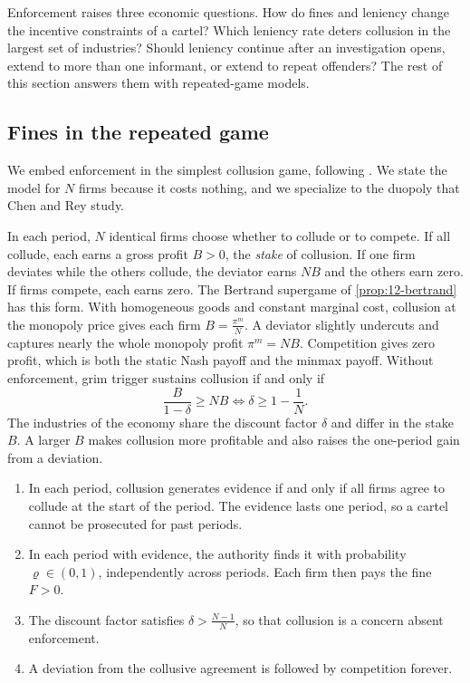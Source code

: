 Enforcement raises three economic questions. How do fines and leniency change the incentive constraints of a
cartel? Which leniency rate deters collusion in the largest set of industries? Should leniency continue after an
investigation opens, extend to more than one informant, or extend to repeat offenders? The rest of this section
answers them with repeated-game models.

\subsection{Fines in the repeated game}\label{sec:12-fines}

We embed enforcement in the simplest collusion game, following \citet[Section~2]{ChenRey2013}. We state the model
for $N$ firms because it costs nothing, and we specialize to the duopoly that Chen and Rey study.

In each period, $N$ identical firms choose whether to collude or to compete. If all collude, each earns a gross profit
$B > 0$, the \emph{stake} of collusion. If one firm deviates while the others collude, the deviator earns $NB$ and the
others earn zero. If firms compete, each earns zero. The Bertrand supergame of \cref{prop:12-bertrand} has this form.
With homogeneous goods and constant marginal cost, collusion at the monopoly price gives each firm
$B = \frac{\pi^m}{N}$. A deviator slightly undercuts and captures nearly the whole monopoly profit $\pi^m = NB$.
Competition gives zero profit, which is both the static Nash payoff and the minmax payoff. Without enforcement, grim
trigger sustains collusion if and only if
\begin{equation*}
\frac{B}{1-\delta} \ge NB \iff \delta \ge 1 - \frac{1}{N}.
\end{equation*}
The industries of the economy share the discount factor $\delta$ and differ in the stake $B$. A larger $B$ makes
collusion more profitable and also raises the one-period gain from a deviation.

\begin{assumption}\label{asm:12-enforcement}
\leavevmode
\begin{enumerate}[label=(\roman*)]
\item In each period, collusion generates evidence if and only if all firms agree to collude at the start of the
period. The evidence lasts one period, so a cartel cannot be prosecuted for past periods.
\item In each period with evidence, the authority finds it with probability $\varrho \in (0,1)$, independently across
periods. Each firm then pays the fine $F > 0$.
\item The discount factor satisfies $\delta > \frac{N-1}{N}$, so that collusion is a concern absent enforcement.
\item A deviation from the collusive agreement is followed by competition forever.
\end{enumerate}
\end{assumption}

